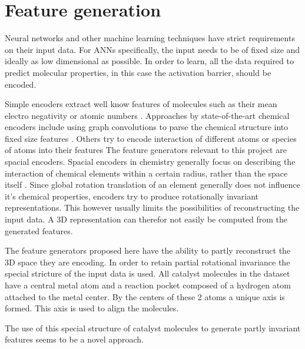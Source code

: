 
\chapter{Feature generation}
\label{ch:features}
Neural networks and other machine learning techniques have strict requirements on their input data.
For ANNs specifically, the input needs to be of fixed size and ideally as low dimensional as possible.
In order to learn, all the data required to predict molecular properties, in this case the activation barrier, should be encoded.

Simple encoders extract well know features of molecules such as their mean electro negativity or atomic numbers \cite{LO20181538}.
Approaches by state-of-the-art chemical encoders include using graph convolutions to parse the chemical structure into fixed size features \cite{GNN_ENCODER}.
Others try to encode interaction of different atoms or species of atoms into their features \cite{PhysRevLett.108.058301}
The feature generators relevant to this project are spacial encoders.
Spacial encoders in chemistry generally focus on describing the interaction of chemical elements within a certain radius, rather 
than the space itself \cite{Bart_k_2013}.
Since global rotation translation of an element generally does not influence it's chemical properties, 
encoders try to produce rotationally invariant representations.
This however usually limits the possibilities of reconstructing the input data.
A 3D representation can therefor not easily be computed from the generated features.

The feature generators proposed here have the ability to partly reconstruct the 3D space they are encoding.
In order to retain partial rotational invariance the special stricture of the input data is used.
All catalyst molecules in the dataset have a central metal atom and a reaction pocket composed of a hydrogen atom attached to the metal center.
By the centers of these 2 atoms a unique axis is formed.
This axis is used to align the molecules.

The use of this special structure of catalyst molecules to generate partly invariant features seems to be a novel approach.


